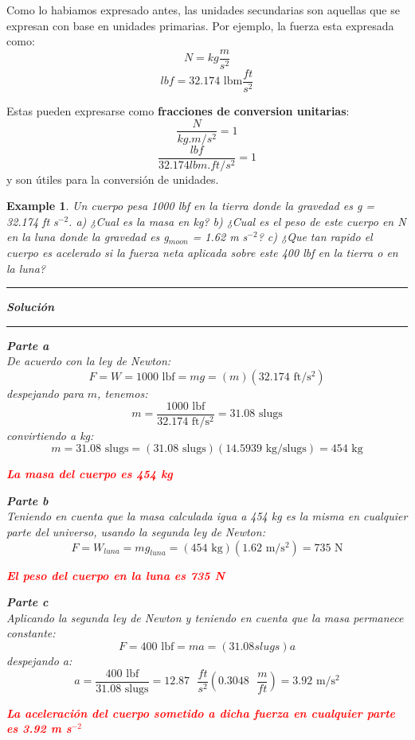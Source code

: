 \documentclass[10pt, oneside]{article}
\newtheorem{exa}{Example}
\begin{document}
Como lo habiamos expresado antes, las unidades secundarias son aquellas que se expresan con base en unidades primarias. Por ejemplo, la fuerza esta expresada como:
$$
N=kg\frac{m}{s^2}
$$
$$
lbf = 32.174 \text{ lbm$\frac{ft}{s^2}$}
$$

Estas pueden expresarse como \textbf{fracciones de conversion unitarias}:
$$
\frac{N}{kg.m/s^2} = 1
$$
$$
\frac{lbf}{32.174lbm.ft/s^{2}} = 1
$$
y son \'utiles para la conversi\'on de unidades.

\begin{shaded}
\begin{exa}
Un cuerpo pesa 1000 lbf en la tierra donde la gravedad es g = 32.174 ft s$^{-2}$. a) ¿Cual es la masa en kg? b) ¿Cual es el peso de este cuerpo en N en la luna donde la gravedad es g$_{moon}$ = 1.62 m s$^{-2}$? c) ¿Que tan rapido el cuerpo es acelerado si la fuerza neta aplicada sobre este 400 lbf en la tierra o en la luna?
\vspace{0.2cm}
\hrule
\vspace{0.2cm}
\noindent \textbf{Soluci\'on}
\vspace{0.2cm}
\hrule
\vspace{0.2cm}
\noindent \textbf{Parte a}\\ 
De acuerdo con la ley de Newton:
$$
F=W=1000 \text{ lbf} = mg=(m)(32.174 \text{ ft/s$^2$})
$$
despejando para $m$, tenemos:
$$
m = \frac{1000 \text{ lbf}}{32.174 \text{ ft/s$^2$}} = 31.08 \text{ slugs}
$$
convirtiendo a kg:
$$
m = 31.08 \text{ slugs} = (31.08 \text{ slugs})(14.5939 \text{ kg/slugs}) = 454 \text{ kg}
$$
\begin{center}
\textcolor{red}{\textbf{La masa del cuerpo es 454 kg}}
\end{center}

\noindent \textbf{Parte b}\\
Teniendo en cuenta que la masa calculada igua a 454 kg es la misma en cualquier parte del universo, usando la segunda ley de Newton:
$$
F = W_{luna} = mg_{luna} = (454\text{ kg})(1.62 \text{ m/s$^2$})=735 \text{ N}
$$
\begin{center}
\textcolor{red}{\textbf{El peso del cuerpo en la luna es 735 N}}
\end{center}

\noindent \textbf{Parte c}\\
Aplicando la segunda ley de Newton y teniendo en cuenta que la masa permanece constante:
$$
F = 400 \text{ lbf} = ma = (31.08 slugs)a
$$
despejando a:
$$
a = \frac{400 \text{ lbf}}{31.08 \text{ slugs}} = 12.87 \text{ $\frac{ft}{s^2}$} \left( 0.3048\text{ $\frac{m}{ft}$} \right) = 3.92 \text{ m/s$^2$}
$$

\begin{center}
\textcolor{red}{\textbf{La aceleraci\'on del cuerpo sometido a dicha fuerza en cualquier parte es 3.92 m s$^{-2}$}}
\end{center}

\end{exa}
\end{shaded}
\end{document}
